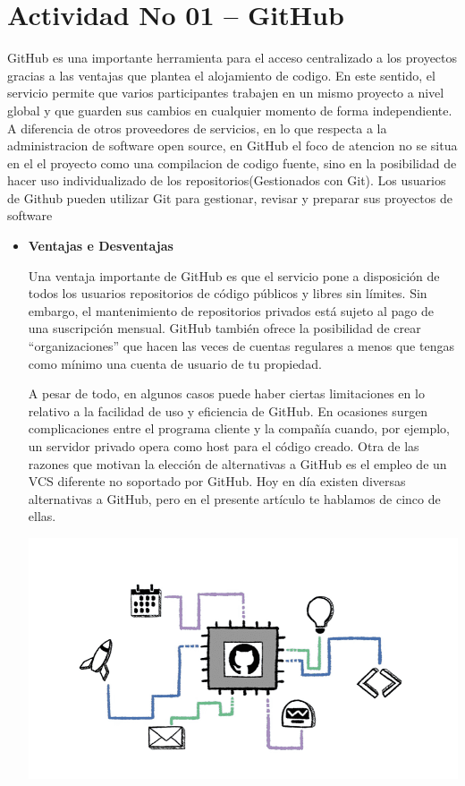 \section{Actividad No 01 – GitHub} 
GitHub es una importante herramienta para el acceso centralizado a los proyectos gracias a las ventajas que plantea el alojamiento de codigo. En este sentido, el servicio permite que varios participantes trabajen en un mismo proyecto a nivel global y que guarden sus cambios en cualquier momento de forma independiente. A diferencia de otros proveedores de servicios, en lo que respecta a la administracion de software open source, en GitHub el foco de atencion no se situa en el el proyecto como una compilacion de codigo fuente, sino en la posibilidad de hacer uso individualizado de los repositorios(Gestionados con Git). Los usuarios de Github pueden utilizar Git para gestionar, revisar y preparar sus proyectos de software

\begin{itemize}

	\item\textbf {Ventajas e Desventajas}

	Una ventaja importante de GitHub es que el servicio pone a disposici\'on de todos los usuarios repositorios de c\'odigo p\'ublicos y libres sin l\'imites. Sin embargo, el mantenimiento de repositorios privados está sujeto al pago de una suscripción mensual. GitHub también ofrece la posibilidad de crear “organizaciones” que hacen las veces de cuentas regulares a menos que tengas como mínimo una cuenta de usuario de tu propiedad.

A pesar de todo, en algunos casos puede haber ciertas limitaciones en lo relativo a la facilidad de uso y eficiencia de GitHub. En ocasiones surgen complicaciones entre el programa cliente y la compañ\'ia cuando, por ejemplo, un servidor privado opera como host para el código creado. Otra de las razones que motivan la elección de alternativas a GitHub es el empleo de un VCS diferente no soportado por GitHub. Hoy en d\'ia existen diversas alternativas a GitHub, pero en el presente artículo te hablamos de cinco de ellas.
	\begin{center}
	\includegraphics[width=17cm]{./Imagenes/git} 
	\end{center}


\end{itemize} 